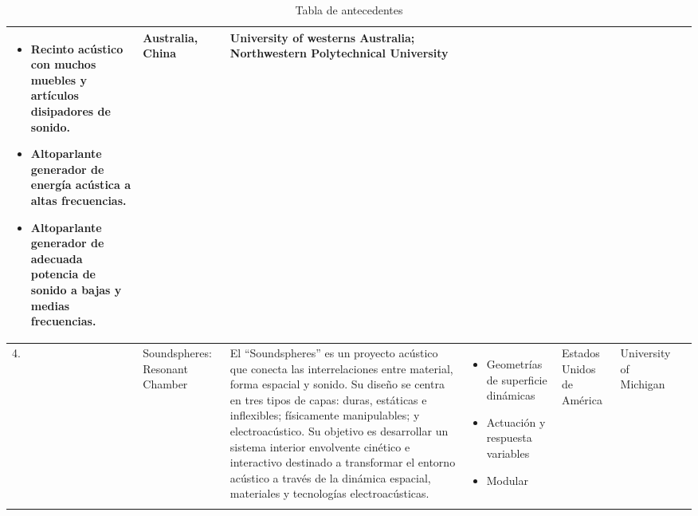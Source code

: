 \begin{center}
\begin{longtable}[!htb]{ | m{2em} | m{10em} | m{10em} | m{10em} | m{5em} | m{8em} |m{2em} |}
\begin{itemize}
    \item Recinto acústico con muchos muebles y artículos disipadores de sonido.
    \item Altoparlante generador de energía acústica a altas frecuencias.
    \item Altoparlante generador de adecuada potencia de sonido a bajas y medias frecuencias.
\end{itemize} 
& Australia, China & University of westerns Australia; Northwestern Polytechnical University & \cite{Y.Lei2012}\\
\hline
  4. & Soundspheres: Resonant Chamber & El “Soundspheres” es un proyecto acústico que conecta las interrelaciones entre material, forma espacial y sonido. Su diseño se centra en tres tipos de capas: duras, estáticas e inflexibles; físicamente manipulables; y electroacústico. Su objetivo es desarrollar un sistema interior envolvente cinético e interactivo destinado a transformar el entorno acústico a través de la dinámica espacial, materiales y tecnologías electroacústicas.  & 
\begin{itemize}
    \item Geometrías de superficie dinámicas
    \item Actuación y respuesta variables
    \item Modular
\end{itemize} 
& Estados Unidos de América & University of Michigan & \cite{Thun2012} \\
\hline
\caption{Tabla de antecedentes}
\label{tab:Antecedentes}
\end{longtable}
\end{center}

